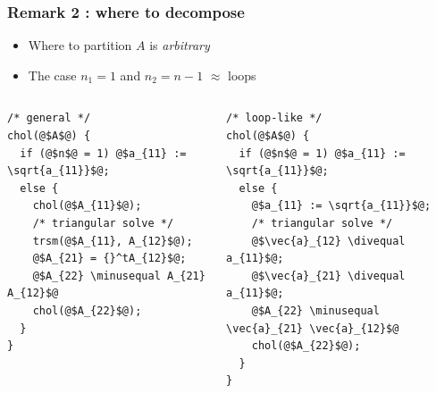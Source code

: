 \documentclass[12pt,dvipdfmx]{beamer}
\newcommand{\minusequal}{\mbox{\tt\ -= }}
\newcommand{\divequal}{\mbox{\tt\ /= }}
\begin{document}
\begin{frame}[fragile]
\frametitle{Remark 2 : where to decompose}
\begin{itemize}
\item Where to partition $A$ is {\em arbitrary}
\item The case $n_1 = 1$ and $n_2 = n - 1$ $\approx$ loops
\end{itemize}

\begin{center}
\def\svgwidth{0.5\textwidth}
{\tiny}
\end{center}

\begin{columns}[t]
\begin{column}{0.5\textwidth}
\begin{lstlisting}[basicstyle=\scriptsize]
/* general */
chol(@$A$@) {
  if (@$n$@ = 1) @$a_{11} := \sqrt{a_{11}}$@;
  else {
    chol(@$A_{11}$@);
    /* triangular solve */
    trsm(@$A_{11}, A_{12}$@);
    @$A_{21} = {}^tA_{12}$@;
    @$A_{22} \minusequal A_{21} A_{12}$@
    chol(@$A_{22}$@);
  }
}
\end{lstlisting}
\end{column}

\begin{column}{0.5\textwidth}
\begin{lstlisting}[basicstyle=\scriptsize]
/* loop-like */
chol(@$A$@) {
  if (@$n$@ = 1) @$a_{11} := \sqrt{a_{11}}$@;
  else {
    @$a_{11} := \sqrt{a_{11}}$@;
    /* triangular solve */
    @$\vec{a}_{12} \divequal a_{11}$@;
    @$\vec{a}_{21} \divequal a_{11}$@;
    @$A_{22} \minusequal \vec{a}_{21} \vec{a}_{12}$@
    chol(@$A_{22}$@);
  }
}
\end{lstlisting}

\end{column}
\end{columns}
\end{frame}
\end{document}

